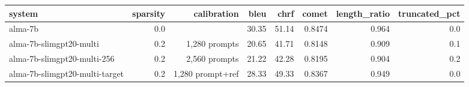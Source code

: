 \begin{tabular}{lrrrrrrr}
\toprule
system & sparsity & calibration & bleu & chrf & comet & length_ratio & truncated_pct \\
\midrule
alma-7b & 0.0 &  & 30.35 & 51.14 & 0.8474 & 0.964 & 0.0 \\
alma-7b-slimgpt20-multi & 0.2 & 1,280 prompts & 20.65 & 41.71 & 0.8148 & 0.909 & 0.1 \\
alma-7b-slimgpt20-multi-256 & 0.2 & 2,560 prompts & 21.22 & 42.28 & 0.8195 & 0.904 & 0.2 \\
alma-7b-slimgpt20-multi-target & 0.2 & 1,280 prompt+ref & 28.33 & 49.33 & 0.8367 & 0.949 & 0.0 \\
\bottomrule
\end{tabular}
